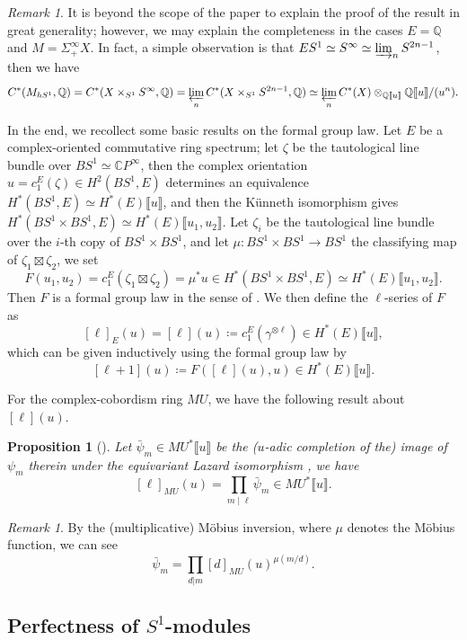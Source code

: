 \documentclass[11pt]{amsart}
\numberwithin{equation}{section}
\theoremstyle{plain}
\newtheorem{Prop}[prop]{Proposition}
\theoremstyle{definition}
\theoremstyle{remark}
\newtheorem{RMK}[rmk]{Remark}
\newcommand{\bC} { {\mathbb{C}}}
\newcommand{\bQ} { {\mathbb{Q}}}
\newcommand{\fpw}[1]{{\llbracket #1\rrbracket}}
\begin{document}
\begin{RMK}
It is beyond the scope of the paper to explain the proof of the result in great generality; however, we may explain the completeness in the cases $ E=\bQ$ and $ M=\Sigma^\infty_+ X$. In fact, a simple observation is that $ES^1\simeq S^\infty\simeq \varinjlim_n S^{2n-1}$, then we have 
\[C^*(M_{hS^1},\bQ)=C^*(X\times_{S^1} S^{\infty},\bQ)=\varprojlim_nC^*(X\times_{S^1} S^{2n-1},\bQ)\simeq \varprojlim_nC^*(X)\otimes_{\bQ\fpw{u}} \bQ\fpw{u}/(u^n).\]
\end{RMK}

In the end, we recollect some basic results on the formal group law. Let $E$ be a complex-oriented commutative ring spectrum; let $\zeta$ be the tautological line bundle over $BS^1\simeq \bC P^\infty$, then the complex orientation $u=c_1^E(\zeta)\in H^2(BS^1,E)$ determines an equivalence $H^*(BS^1,E)\simeq H^*(E)\fpw{u}$, and then the Künneth isomorphism gives $H^*(BS^1\times BS^1,E)\simeq H^*(E)\fpw{u_1,u_2}$. Let $\zeta_i$ be the tautological line bundle over the $i$-th copy of $BS^1\times BS^1$, and let $\mu:BS^1\times BS^1 \to BS^1$ the classifying map of  $\zeta_1\boxtimes\zeta_2$, we set
\[F(u_1,u_2)=c_1^E(\zeta_1\boxtimes\zeta_2)=\mu^*u\in H^*(BS^1\times BS^1,E)\simeq H^*(E)\fpw{u_1,u_2}.\]
Then $F$ is a formal group law in the sense of \cite{Quillen1969FormalGroupLaws}. We then define the $\ell$-series of $F$ as
\[[\ell]_E(u)=[\ell](u)\coloneqq c_1^E(\gamma^{\otimes \ell}) \in H^*(E)\fpw{u},\]
which can be given inductively using the formal group law by
\[[\ell+1](u)\coloneqq F([\ell](u),u)\in H^*(E)\fpw{u}.\]

For the complex-cobordism ring $MU$, we have the following result about $[\ell](u)$.

\begin{Prop}[{\cite[Proposition 5.46]{Hausmann2022}}]\label{prop: decomposition of ell series}Let $\bar{\psi}_m\in MU^*\fpw{u}$ be the ($u$-adic completion of the) image of $\psi_m$ therein under the equivariant Lazard isomorphism \cite[Theorem A]{Hausmann2022}, we have 
\[[\ell]_{MU}(u)=\prod_{m\mid \ell}\bar{\psi}_m \in MU^*\fpw{u}.\]
\end{Prop}
\begin{RMK}By the (multiplicative) Möbius inversion, where $\mu$ denotes the Möbius function, we can see 
\[\bar{\psi}_m=\prod_{d|m}[d]_{MU}(u)^{\mu(m/d)}.\]
\end{RMK}




\subsection{\texorpdfstring{Perfectness of $S^1$-modules}{}}
\end{document}
